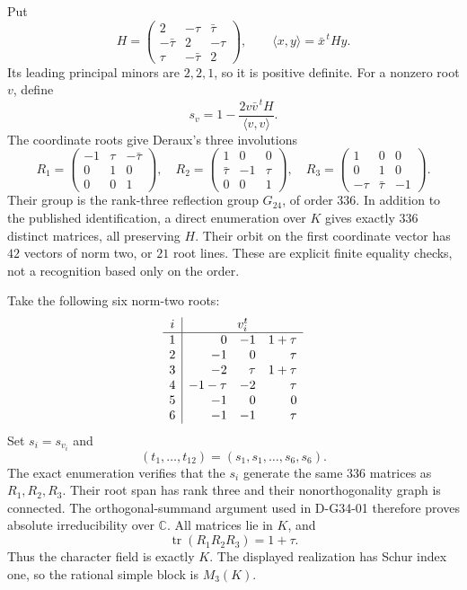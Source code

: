 Put
\[
 H=\begin{pmatrix}
 2&-\tau&\bar\tau\\
 -\bar\tau&2&-\tau\\
 \tau&-\bar\tau&2
 \end{pmatrix},\qquad
 \langle x,y\rangle=\bar x^{\,t}Hy.
\]
Its leading principal minors are \(2,2,1\), so it is positive definite.
For a nonzero root \(v\), define
\[
 s_v=1-\frac{2v\bar v^{\,t}H}{\langle v,v\rangle}.
\]
The coordinate roots give Deraux's three involutions
\[
 R_1=\begin{pmatrix}-1&\tau&-\bar\tau\\0&1&0\\0&0&1\end{pmatrix},\quad
 R_2=\begin{pmatrix}1&0&0\\\bar\tau&-1&\tau\\0&0&1\end{pmatrix},\quad
 R_3=\begin{pmatrix}1&0&0\\0&1&0\\-\tau&\bar\tau&-1\end{pmatrix}.
\]
Their group is the rank-three reflection group \(G_{24}\), of order
\(336\).  In addition to the published identification, a direct enumeration
over \(K\) gives exactly \(336\) distinct matrices, all preserving \(H\).
Their orbit on the first coordinate vector has \(42\) vectors of norm two,
or \(21\) root lines.  These are explicit finite equality checks, not a
recognition based only on the order.

Take the following six norm-two roots:
\[
\begin{array}{c|rrr}
 i&\multicolumn{3}{c}{v_i^t}\\\hline
 1&0&-1&1+\tau\\
 2&-1&0&\tau\\
 3&-2&\tau&1+\tau\\
 4&-1-\tau&-2&\tau\\
 5&-1&0&0\\
 6&-1&-1&\tau
\end{array}
\]
Set \(s_i=s_{v_i}\) and
\[
                (t_1,\ldots,t_{12})=(s_1,s_1,\ldots,s_6,s_6).
\]
The exact enumeration verifies that the \(s_i\) generate the same \(336\)
matrices as \(R_1,R_2,R_3\).  Their root span has rank three and their
nonorthogonality graph is connected.  The orthogonal-summand argument used
in D-G34-01 therefore proves absolute irreducibility over \(\mathbb C\).
All matrices lie in \(K\), and
\[
                  \operatorname{tr}(R_1R_2R_3)=1+\tau.
\]
Thus the character field is exactly \(K\).  The displayed realization has
Schur index one, so the rational simple block is \(M_3(K)\).

